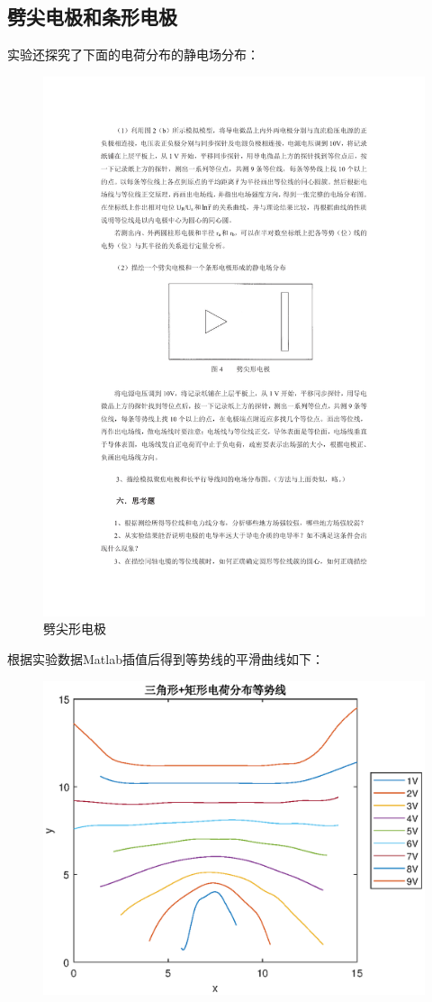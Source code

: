 \documentclass{WHUReport}
\begin{document}
\begin{multicols}{2}
	\section{劈尖电极和条形电极}
	实验还探究了下面的电荷分布的静电场分布：
	\begin{figure}[H]
		\centering
		\includegraphics[width=0.85\linewidth]{figs/wedge.pdf}
		\caption{劈尖形电极}
	\end{figure}	
	根据实验数据Matlab插值后得到等势线的平滑曲线如下：
	\begin{figure}[H]
		\centering
		\includegraphics[width=0.85\linewidth]{figs/wedge.eps}

\end{figure}
\end{multicols}
\end{document}
